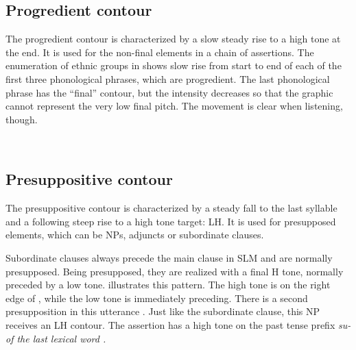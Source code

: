 \subsection{Progredient contour}\label{sec:phon:Progredientcontour}
The progredient contour is characterized by a slow steady rise to a high tone at the end. It is used for the non-final elements in a chain of assertions. The enumeration of ethnic groups in  shows slow rise from start to end of each of the first three phonological phrases, which are progredient. The last phonological phrase has the ``final'' contour, but the intensity decreases so that the graphic cannot represent the very low final pitch. The movement is clear when listening, though.


 \\


\subsection{Presuppositive contour}\label{sec:phon:Presuppositivecontour}
The presuppositive contour is characterized by a steady fall to the last syllable and a following steep rise to a high tone target: LH. It is used for presupposed elements, which can be NPs, adjuncts or subordinate clauses.


Subordinate clauses always precede the main clause in SLM and are normally presupposed. Being presupposed, they are realized with a final H tone, normally preceded by a low tone.  illustrates this pattern. The high tone is on the right edge of , while the low tone is immediately preceding. There is a second presupposition in this utterance . Just like the subordinate clause, this NP receives an LH contour. The assertion has a high tone on the past tense prefix \em su- \em of the last lexical word .


